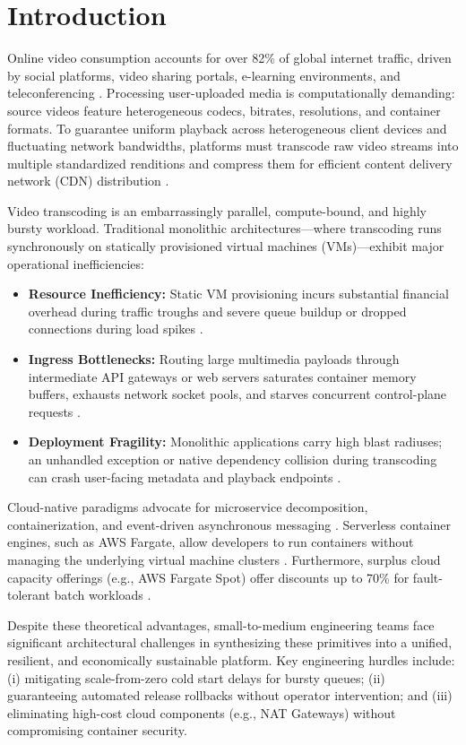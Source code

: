 \documentclass[conference]{IEEEtran}
\begin{document}
\section{Introduction}
Online video consumption accounts for over 82\% of global internet traffic, driven by social platforms, video sharing portals, e-learning environments, and teleconferencing \cite{cisco}. Processing user-uploaded media is computationally demanding: source videos feature heterogeneous codecs, bitrates, resolutions, and container formats. To guarantee uniform playback across heterogeneous client devices and fluctuating network bandwidths, platforms must transcode raw video streams into multiple standardized renditions and compress them for efficient content delivery network (CDN) distribution \cite{timmerer}.

Video transcoding is an embarrassingly parallel, compute-bound, and highly bursty workload. Traditional monolithic architectures—where transcoding runs synchronously on statically provisioned virtual machines (VMs)—exhibit major operational inefficiencies:
\begin{itemize}
    \item \textbf{Resource Inefficiency:} Static VM provisioning incurs substantial financial overhead during traffic troughs and severe queue buildup or dropped connections during load spikes \cite{armbrust}.
    \item \textbf{Ingress Bottlenecks:} Routing large multimedia payloads through intermediate API gateways or web servers saturates container memory buffers, exhausts network socket pools, and starves concurrent control-plane requests \cite{nygard}.
    \item \textbf{Deployment Fragility:} Monolithic applications carry high blast radiuses; an unhandled exception or native dependency collision during transcoding can crash user-facing metadata and playback endpoints \cite{richardson}.
\end{itemize}

Cloud-native paradigms advocate for microservice decomposition, containerization, and event-driven asynchronous messaging \cite{dragoni, jamshidi}. Serverless container engines, such as AWS Fargate, allow developers to run containers without managing the underlying virtual machine clusters \cite{burns}. Furthermore, surplus cloud capacity offerings (e.g., AWS Fargate Spot) offer discounts up to 70\% for fault-tolerant batch workloads \cite{fargate_spot}.

Despite these theoretical advantages, small-to-medium engineering teams face significant architectural challenges in synthesizing these primitives into a unified, resilient, and economically sustainable platform. Key engineering hurdles include: (i) mitigating scale-from-zero cold start delays for bursty queues; (ii) guaranteeing automated release rollbacks without operator intervention; and (iii) eliminating high-cost cloud components (e.g., NAT Gateways) without compromising container security.
\end{document}
